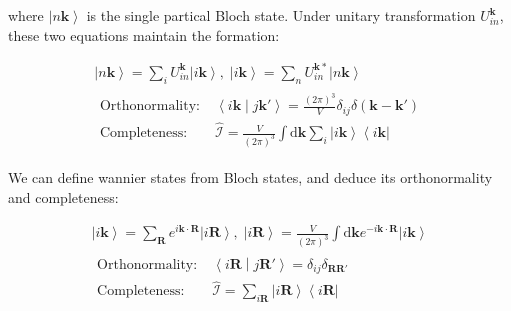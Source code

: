 \noindent
where $\left| n\boldsymbol{k} \right\rangle$ is the single partical Bloch state.
Under unitary transformation $U_{in}^{\boldsymbol{k}}$, these two equations maintain the formation:

\begin{equation}
  \begin{gathered}
    \left| n \boldsymbol{k} \right\rangle 
      = \sum_{i} U_{in}^{\boldsymbol{k}} \left| i\boldsymbol{k} \right\rangle ,\;
    \left| i\boldsymbol{k} \right\rangle = \sum_{n} U_{in}^{\boldsymbol{k}*} \left| n \boldsymbol{k} \right\rangle \\
    \begin{aligned}
      \text{Orthonormality:} \;&
        \left\langle i\boldsymbol{k} \middle| j\boldsymbol{k}' \right\rangle = \frac{(2\pi)^3}{V} \delta_{ij} \delta(\boldsymbol{k}-\boldsymbol{k}') \\
      \text{Completeness:} \;&
        \hat{\mathcal{I}} = \frac{V}{(2\pi)^3} \int \mathrm{d}\boldsymbol{k} \sum_{i} \left| i\boldsymbol{k} \right\rangle \left\langle i\boldsymbol{k} \right| 
    \end{aligned}
  \end{gathered}
\end{equation}

\noindent
We can define wannier states from Bloch states, and deduce its orthonormality and completeness:

\begin{equation}
  \begin{gathered}
    \left| i\boldsymbol{k} \right\rangle 
      = \sum_{\boldsymbol{R}} e^{i\boldsymbol{k} \cdot \boldsymbol{R}} \left| i\boldsymbol{R} \right\rangle ,\;
    \left| i\boldsymbol{R} \right\rangle 
      = \frac{V}{(2\pi)^3} \int \mathrm{d}\boldsymbol{k} e^{-i\boldsymbol{k} \cdot \boldsymbol{R}} 
        \left| i\boldsymbol{k} \right\rangle \\
    \begin{aligned}
      \text{Orthonormality:} \;&
        \left\langle i\boldsymbol{R} \middle| j\boldsymbol{R}' \right\rangle = \delta_{ij} \delta_{\boldsymbol{R}\boldsymbol{R}'} \\
      \text{Completeness:} \;&
        \hat{\mathcal{I}} = \sum_{i\boldsymbol{R}} \left| i\boldsymbol{R} \right\rangle \left\langle i\boldsymbol{R} \right| 
    \end{aligned}
  \end{gathered}
\end{equation}

